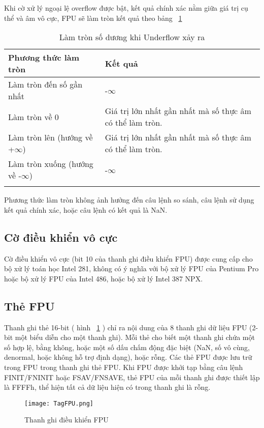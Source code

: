 	Khi cờ xử lý ngoại lệ overflow được bật, kết quả chính xác nằm giữa giá trị cụ thể  và âm vô cực, FPU sẽ làm tròn kết quả theo bảng ~\ref{tb:RCUnderflow}
		\begin{longtable} {|m{6cm}|m{6cm}|}
			\hline
				Phương thức làm tròn & Kết quả \\			
			\hline						
			\hline
				Làm tròn đến số gần nhất & -$\mathbf{\infty}$\\
			\hline
				Làm tròn về 0 & Giá trị lớn nhất gần nhất mà số thực âm có thể làm tròn.\\
			\hline
				Làm tròn lên (hướng về +$\mathbf{\infty}$) &  Giá trị lớn nhất gần nhất mà số thực âm có thể làm tròn.\\
			\hline
				Làm tròn xuống (hướng về -$\mathbf{\infty}$) & 	-$\mathbf{\infty}$\\
			\hline			
			\caption{Làm tròn số dương khi Underflow xảy ra}
			\label{tb:RCUnderflow}
		\end{longtable}
		
		Phương thức làm tròn không ảnh hưởng đến câu lệnh so sánh, câu lệnh sử dụng kết quả chính xác, hoặc câu lệnh có kết quả là NaN.
		
		\subsection*{Cờ điều khiển vô cực}
		Cờ điều khiển vô cực (bit 10 của thanh ghi điều khiển FPU) được cung cấp cho bộ xử lý toán học Intel 281, không có ý nghĩa với bộ xử lý FPU của Pentium Pro hoặc bộ xử lý FPU của Intel 486, hoặc bộ xử lý Intel 387 NPX.
		
		\subsection*{Thẻ FPU}
		Thanh ghi thẻ 16-bit ( hình ~\ref{fig:TagFPU} ) chỉ ra nội dung của 8 thanh ghi dữ liệu FPU (2-bit một biểu diễn cho một thanh ghi). Mỗi thẻ cho biết một thanh ghi chứa một số hợp lệ, bằng không, hoặc một số dấu chấm động đặc biệt (NaN, số vô cùng, denormal, hoặc không hỗ trợ định dạng), hoặc rỗng. Các thẻ FPU được lưu trữ trong FPU trong thanh ghi thẻ FPU. Khi FPU được khởi tạp bằng câu lệnh FINIT/FNINIT hoặc FSAV/FNSAVE, thẻ FPU của mỗi thanh ghi được thiết lập là FFFFh, thể hiện tất cả dữ liệu hiện có trong thanh ghi là rỗng.
		\begin{center}
			\begin{figure}[htp]
				\begin{center}
					\texttt{[image: TagFPU.png]}
				\end{center}
				\caption{Thanh ghi điều khiển FPU}				
				\label{fig:TagFPU}				
			\end{figure}
		\end{center}	

